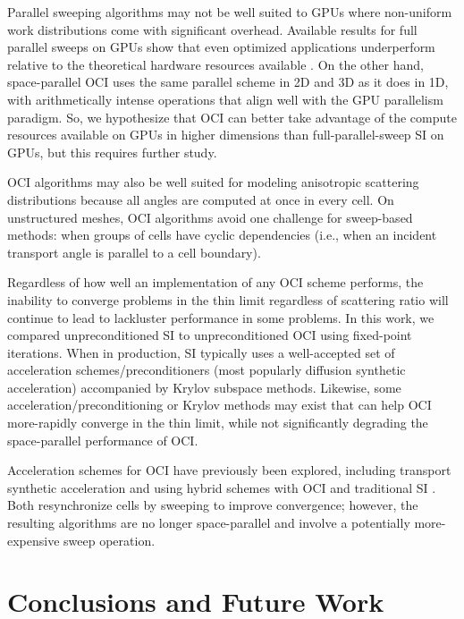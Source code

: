 Parallel sweeping algorithms may not be well suited to GPUs where non-uniform work distributions come with significant overhead. 
Available results for full parallel sweeps on GPUs show that even optimized applications underperform relative to the theoretical hardware resources available \cite{kunen_kripke_2015, wolfe2022roofline, baker_computational_2017}.
On the other hand, space-parallel OCI uses the same parallel scheme in 2D and 3D as it does in 1D, with arithmetically intense operations that align well with the GPU parallelism paradigm.
So, we hypothesize that OCI can better take advantage of the compute resources available on GPUs in higher dimensions than full-parallel-sweep SI on GPUs, but this requires further study.

OCI algorithms may also be well suited for modeling anisotropic scattering distributions because all angles are computed at once in every cell.
On unstructured meshes, OCI algorithms avoid one challenge for sweep-based methods: when groups of cells have cyclic dependencies (i.e., when an incident transport angle is parallel to a cell boundary).

Regardless of how well an implementation of any OCI scheme performs, the inability to converge problems in the thin limit regardless of scattering ratio will continue to lead to lackluster performance in some problems.
In this work, we compared unpreconditioned SI to unpreconditioned OCI using fixed-point iterations.
When in production, SI typically uses a well-accepted set of acceleration schemes/preconditioners (most popularly diffusion synthetic acceleration) accompanied by Krylov subspace methods.
Likewise, some acceleration/preconditioning or Krylov methods may exist that can help OCI more-rapidly converge in the thin limit, while not significantly degrading the space-parallel performance of OCI.

Acceleration schemes for OCI have previously been explored, including transport synthetic acceleration \cite{tsa2009rosa} and using hybrid schemes with OCI and traditional SI \cite{hoagland_hybrid_2021}.
Both resynchronize cells by sweeping to improve convergence; however, the resulting algorithms are no longer space-parallel and involve a potentially more-expensive sweep operation.


\section{Conclusions and Future Work}

